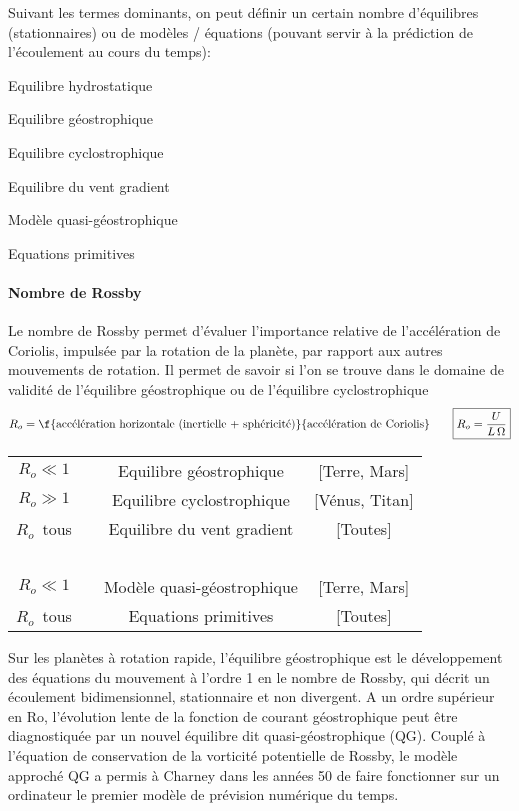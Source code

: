 \sk
Suivant les termes dominants, on peut définir un certain nombre d'équilibres (stationnaires) ou de modèles / équations (pouvant servir à la prédiction de l'écoulement au cours du temps):
\begin{description}
\item{Equilibre hydrostatique} \DDD{\bullet} 
\item{Equilibre g\'eostrophique} \DDD{\bullet}\AAA{\bullet}
\item{Equilibre cyclostrophique} \DDD{\bullet}\CCC{\bullet}
\item{Equilibre du vent gradient} \DDD{\bullet}\AAA{\bullet}\CCC{\bullet}
\item{Modèle quasi-g\'eostrophique} \DDD{\bullet}\AAA{\bullet}\BBB{\bullet}
\item{Equations primitives} \DDD{\bullet}\AAA{\bullet}\BBB{\bullet}\CCC{\bullet}
\end{description}

\mk
\paragraph{Nombre de Rossby} Le nombre de Rossby permet d'évaluer l'importance relative de l'accélération de Coriolis, impulsée par la rotation de la planète, par rapport aux autres mouvements de rotation. Il permet de savoir si l'on se trouve dans le domaine de validité de l'équilibre géostrophique ou de l'équilibre cyclostrophique
\[
R_o=\f{\text{accélération horizontale (inertielle + sphéricité)}}{\text{accélération de Coriolis}}\qquad\boxed{R_o=\frac{U}{L\,\Omega}}
\]
\begin{table}[h!]
\begin{tabular}{cccc}
$R_o \ll 1$ & \DDD{\bullet}\AAA{\bullet} & Equilibre g\'eostrophique & [Terre, Mars]\\
$R_o \gg 1$ & \DDD{\bullet}\CCC{\bullet} & Equilibre cyclostrophique & [Vénus, Titan]\\
$R_o$~tous & \DDD{\bullet}\AAA{\bullet}\CCC{\bullet} & Equilibre du vent gradient & [Toutes]\\
~ & & & \\
$R_o \ll 1$ & \DDD{\bullet}\AAA{\bullet}\BBB{\bullet} & Modèle quasi-g\'eostrophique & [Terre, Mars]\\
$R_o$~tous & \DDD{\bullet}\AAA{\bullet}\BBB{\bullet}\CCC{\bullet} & Equations primitives  & [Toutes]
\end{tabular}
\end{table}

\mk
Sur les planètes à rotation rapide, l'équilibre géostrophique est le développement des équations du mouvement à l'ordre 1 en le nombre de Rossby, qui décrit un écoulement bidimensionnel, stationnaire et non divergent. A un ordre supérieur en $\textrm{Ro}$, l'évolution lente de la fonction de courant géostrophique peut être diagnostiquée par un nouvel équilibre dit quasi-géostrophique (QG). Couplé à l'équation de conservation de la vorticité potentielle de Rossby, le modèle approché QG a permis à Charney dans les années 50 de faire fonctionner sur un ordinateur le premier modèle de prévision numérique du temps.
